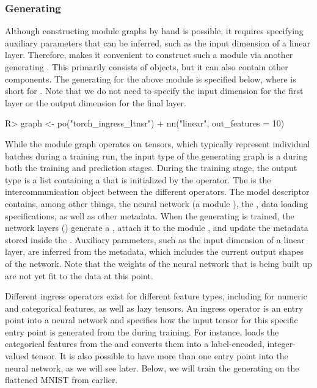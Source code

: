 \documentclass[article]{jss}
\theoremstyle{definition}
\begin{document}
\subsubsection[Generating Graph]{Generating }

Although constructing module graphs by hand is possible, it requires specifying auxiliary parameters that can be inferred, such as the input dimension of a linear layer.
Therefore,  makes it convenient to construct such a module  via another generating .
This  primarily consists of  objects, but it can also contain other components.
The generating  for the above module  is specified below, where  is short for .
Note that we do not need to specify the input dimension for the first layer or the output dimension for the final layer.


\begin{CodeInput}
R> graph <- po("torch_ingress_ltnsr") %
+    nn("linear", out_features = 10) %
\end{CodeInput}

While the module graph operates on tensors, which typically represent individual batches during a training run, the input type of the generating graph is a  during both the training and prediction stages.
During the training stage, the output type is a list containing a  that is initialized by the  operator.
The  is the intercommunication object between the different  operators.
The model descriptor contains, among other things, the neural network (a module ), the , data loading specifications, as well as other metadata.
When the generating  is trained, the network layers () generate a , attach it to the module , and update the metadata stored inside the .
Auxiliary parameters, such as the input dimension of a linear layer, are inferred from the metadata, which includes the current output shapes of the network.
Note that the weights of the neural network that is being built up are not yet fit to the data at this point.

Different ingress operators exist for different feature types, including for numeric and categorical features, as well as lazy tensors.
An ingress operator is an entry point into a neural network and specifies how the input tensor for this specific entry point is generated from the  during training.
For instance,  loads the categorical features from the  and converts them into a label-encoded, integer-valued tensor.
It is also possible to have more than one entry point into the neural network, as we will see later.
Below, we will train the generating  on the flattened MNIST  from earlier.
\end{document}
